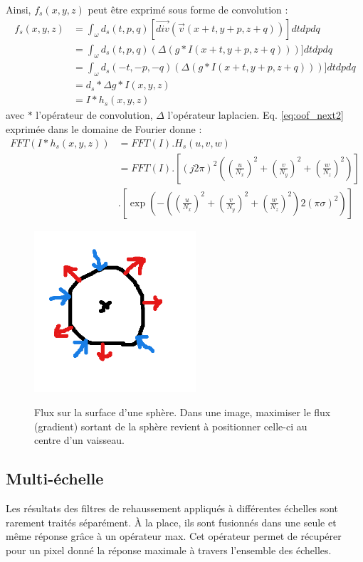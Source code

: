   Ainsi, $f_s(x,y,z)$ peut être exprimé sous forme de convolution :
  \begin{align}
    f_s(x,y,z) & = \int_{\omega} d_s(t,p,q) [\vec{div}( \vec{v}(x+t,y+p, z+q) )] dtdpdq \\
               & = \int_{\omega} d_s(t,p,q) (\Delta(g*I(x+t,y+p, z+q)))] dtdpdq \\
               & = \int_{\omega} d_s(-t,-p,-q) (\Delta(g*I(x+t,y+p, z+q)))] dtdpdq \\
               & = d_s * \Delta g * I(x,y,z) \\
               & = I * h_s(x,y,z)
    \label{eq:oof_next2}
  \end{align}
  avec $*$ l'opérateur de convolution, $\Delta$ l'opérateur laplacien.
  Eq. \ref{eq:oof_next2} exprimée dans le domaine de Fourier donne :
  \begin{align}
    FFT( I * h_s(x,y,z) ) &= FFT(I) . H_s(u,v,w) \\
                         &= FFT(I) . [ (j2 \pi)^2 ( (\frac{u}{N_x})^2 + (\frac{v}{N_y})^2 + (\frac{w}{N_z})^2 ) ] \\
                         & . [ \exp( -( (\frac{u}{N_x})^2 + (\frac{v}{N_y})^2 + (\frac{w}{N_z})^2 ) 2(\pi\sigma)^2 ) ]
  \end{align}
  \begin{figure}[!ht]
    \centering
    \includegraphics[height=6cm]{Images/flux.png}
    \label{fig:flux_sphere}
    \caption{Flux sur la surface d'une sphère. Dans une image, maximiser le flux (gradient) sortant de la sphère revient à positionner celle-ci au centre d'un vaisseau.}
  \end{figure}
  \subsection{Multi-échelle}
  \label{sec:EA:rehaussement:echelle:multiScale}

  Les résultats des filtres de rehaussement appliqués à différentes échelles sont rarement traités séparément. À la place, ils sont fusionnés dans une seule et même réponse grâce à un opérateur max. Cet opérateur permet de récupérer pour un pixel donné la réponse maximale à travers l'ensemble des échelles.
  
